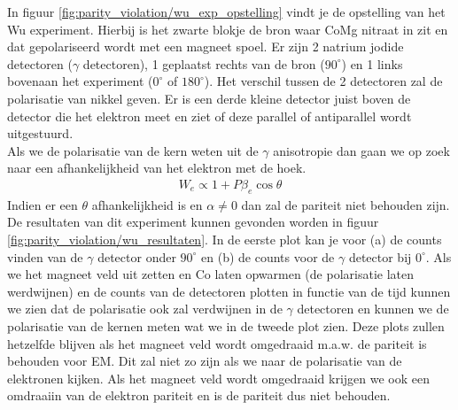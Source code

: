 \documentclass[../main.tex]{subfiles}
\begin{document}
In figuur \ref{fig:parity_violation/wu_exp_opstelling} vindt je de opstelling van het Wu experiment. Hierbij is het zwarte blokje de bron waar CoMg nitraat in zit en dat gepolariseerd wordt met een magneet spoel. Er zijn 2 natrium jodide detectoren ($\gamma$ detectoren), 1 geplaatst rechts van de bron ($90^\circ$) en 1 links bovenaan het experiment ($0^\circ$ of $180^\circ$). Het verschil tussen de 2 detectoren zal de polarisatie van nikkel geven. Er is een derde kleine detector juist boven de detector die het elektron meet en ziet of deze parallel of antiparallel wordt uitgestuurd.\\
Als we de polarisatie van de kern weten uit de $\gamma$ anisotropie dan gaan we op zoek naar een afhankelijkheid van het elektron met de hoek.
\begin{equation}
    \begin{aligned}
        \label{eq:wu_elektron}
        W_e \propto 1 + P\beta_e\cos\theta
    \end{aligned}
\end{equation}
Indien er een $\theta$ afhankelijkheid is en $\alpha \neq 0$ dan zal de pariteit niet behouden zijn. De resultaten van dit experiment kunnen gevonden worden in figuur \ref{fig:parity_violation/wu_resultaten}. In de eerste plot kan je voor (a) de counts vinden van de $\gamma$ detector onder $90^\circ$ en (b) de counts voor de $\gamma$ detector bij $0^\circ$. Als we het magneet veld uit zetten en Co laten opwarmen (de polarisatie laten werdwijnen) en de counts van de detectoren plotten in functie van de tijd kunnen we zien dat de polarisatie ook zal verdwijnen in de $\gamma$ detectoren en kunnen we de polarisatie van de kernen meten wat we in de tweede plot zien. Deze plots zullen hetzelfde blijven als het magneet veld wordt omgedraaid m.a.w. de pariteit is behouden voor EM. Dit zal niet zo zijn als we naar de polarisatie van de elektronen kijken. Als het magneet veld wordt omgedraaid krijgen we ook een omdraaiin van de elektron pariteit en is de pariteit dus niet behouden.
\end{document}
